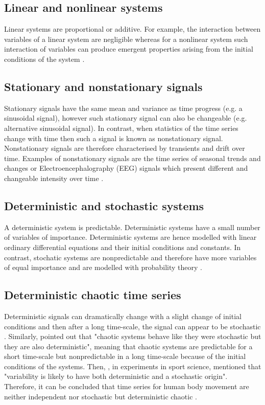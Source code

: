 \subsection{Linear and nonlinear systems}
Linear systems are proportional or additive. For example, the interaction 
between variables of a linear system are negligible whereas for a nonlinear 
system such interaction of variables can produce emergent properties 
arising from the initial conditions of the system \citep{klonowski2007}.

\subsection{Stationary and nonstationary signals}
Stationary signals have the same mean and variance as time progress (e.g. 
a sinusoidal signal), however such stationary signal can also be changeable
(e.g. alternative sinusoidal signal).
In contrast, when statistics of the time series change with time then 
such a signal is known as nonstationary signal.
Nonstationary signals are therefore characterised by transients and 
drift over time. Examples of nonstationary signals are the time series of 
seasonal trends and changes \citep{kitagawa1984} or Electroencephalography (EEG) 
signals which present different and changeable intensity over time 
\citep{klonowski2007}.

\subsection{Deterministic and stochastic systems}
A deterministic system is predictable. Deterministic systems 
have a small number of variables of importance. 
Deterministic systems are hence modelled with linear ordinary 
differential equations and their initial conditions and constants.
In contrast, stochatic systems are nonpredictable and therefore have 
more variables of equal importance and are 
modelled with probability theory \citep{klonowski2007}.

\subsection{Deterministic chaotic time series}

Deterministic signals can dramatically change with a slight change 
of initial conditions and then after a long time-scale, the signal can 
appear to be stochastic \citep{amato1992}. Similarly, 
\citealt[p. 11]{klonowski2007} pointed out that "chaotic systems behave 
like they were stochastic but they are also deterministic", meaning that 
chaotic systems are predictable for a short time-scale but nonpredictable 
in a long time-scale because of the initial conditions of the systems. 
Then, \citealt[p. 78]{preatoni2013}, in experiments in sport science, mentioned 
that "variability is likely to have both deterministic and a 
stochastic origin". Therefore, it can be concluded that time series for 
human body movement are neither independent nor stochastic but 
deterministic chaotic \citep{stergiou2006, harbourne2009, stergiou2011}.


